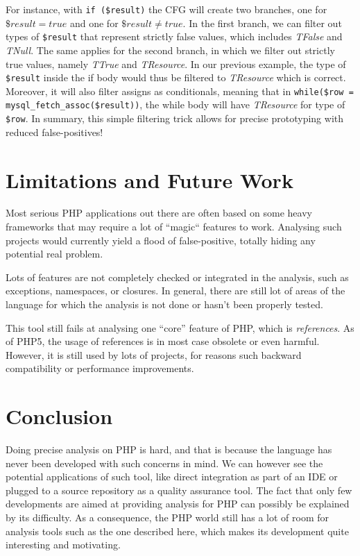 \documentclass[a4paper]{article}
\begin{document}
For instance, with \verb/if ($result)/ the CFG will create two branches, one
for $\$result = true$ and one for $\$result \neq true$. In the first branch, we
can filter out types of \verb/$result/ that represent strictly false values,
which includes \emph{TFalse} and \emph{TNull}. The same applies for the second
branch, in which we filter out strictly true values, namely \emph{TTrue} and
\emph{TResource}. In our previous example, the type of \verb/$result/ inside
the if body would thus be filtered to \emph{TResource} which is correct.
Moreover, it will also filter assigns as conditionals, meaning that in 
\verb/while($row = mysql_fetch_assoc($result))/, the while body will have
\emph{TResource} for type of \verb/$row/. In summary, this simple filtering
trick allows for precise prototyping with reduced false-positives!

\section{Limitations and Future Work}
Most serious PHP applications out there are often based on some heavy frameworks
that may require a lot of ``magic`` features to work. Analysing such projects
would currently yield a flood of false-positive, totally hiding any potential
real problem.

Lots of features are not completely checked or integrated in the analysis,
such as exceptions, namespaces, or closures. In general, there are still
lot of areas of the language for which the analysis is not done or hasn't
been properly tested.

This tool still fails at analysing one ``core'' feature of PHP, which is
\emph{references}. As of PHP5, the usage of references is in most case obsolete
or even harmful. However, it is still used by lots of projects, for reasons
such backward compatibility or performance improvements.

\section{Conclusion}
Doing precise analysis on PHP is hard, and that is because the language has never
been developed with such concerns in mind. We can however see the potential
applications of such tool, like direct integration as part of an IDE or
plugged to a source repository as a quality assurance tool. The fact that only
few developments are aimed at providing analysis for PHP can possibly be
explained by its difficulty. As a consequence, the PHP world still has a lot
of room for analysis tools such as the one described here, which  makes its
development quite interesting and motivating.
\end{document}
